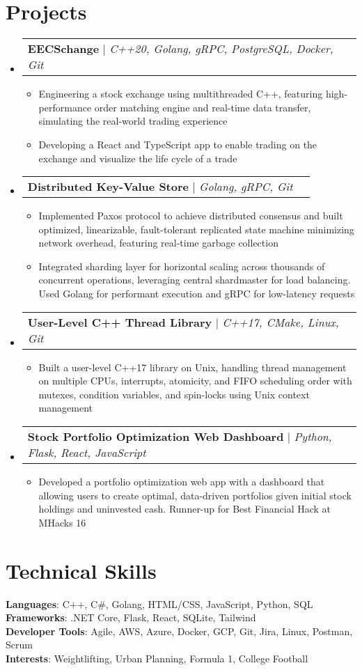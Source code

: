 \documentclass[letterpaper,11pt]{article}
\makeatletter
\newcommand{\resumeItem}[1]{
  \item\small{
    {#1 \vspace{-2pt}}
  }
}
\newcommand{\resumeProjectHeading}[2]{
    \item
    \begin{tabular*}{0.97\textwidth}{l@{\extracolsep{\fill}}r}
      \small#1 & #2 \\
    \end{tabular*}\vspace{-7pt}
}
\newcommand{\resumeSubHeadingListStart}{\begin{itemize}[leftmargin=0.15in, label={}]}
\newcommand{\resumeSubHeadingListEnd}{\end{itemize}}
\newcommand{\resumeItemListStart}{\begin{itemize}}
\newcommand{\resumeItemListEnd}{\end{itemize}\vspace{-5pt}}
\makeatother
\begin{document}
\section{Projects}
    \resumeSubHeadingListStart
      \resumeProjectHeading
          {\textbf{EECSchange} $|$ \emph{C++20, Golang, gRPC, PostgreSQL, Docker, Git}}{}
          \resumeItemListStart
            \resumeItem{Engineering a stock exchange using multithreaded C++, featuring high-performance order matching engine and real-time data transfer, simulating the real-world trading experience}
            \resumeItem{Developing a React and TypeScript app to enable trading on the exchange and visualize the life cycle of a trade}
          \resumeItemListEnd
      \resumeProjectHeading
          {\textbf{Distributed Key-Value Store} $|$ \emph{Golang, gRPC, Git}}{}
          \resumeItemListStart
            \resumeItem{Implemented Paxos protocol to achieve distributed consensus and built optimized, linearizable, fault-tolerant replicated state machine minimizing network overhead, featuring real-time garbage collection}
            \resumeItem{Integrated sharding layer for horizontal scaling across thousands of concurrent operations, leveraging central shardmaster for load balancing. Used Golang for performant execution and gRPC for low-latency requests}
          \resumeItemListEnd
      \resumeProjectHeading
        {\textbf{User-Level C++ Thread Library} $|$ \emph{C++17, CMake, Linux, Git}}{}
        \resumeItemListStart
          \resumeItem{Built a user-level C++17 library on Unix, handling thread management on multiple CPUs, interrupts, atomicity, and FIFO scheduling order with mutexes, condition variables, and spin-locks using Unix context management}
        \resumeItemListEnd
      \resumeProjectHeading
        {\textbf{Stock Portfolio Optimization Web Dashboard} $|$ \emph{Python, Flask, React, JavaScript}}{}
        \resumeItemListStart
          \resumeItem{Developed a portfolio optimization web app with a dashboard that allowing users to create optimal, data-driven portfolios given initial stock holdings and uninvested cash. Runner-up for Best Financial Hack at MHacks 16}
        \resumeItemListEnd
    \resumeSubHeadingListEnd
%
\section{Technical Skills}
 \begin{itemize}[leftmargin=0.15in, label={}]
    \small{\item{
     \textbf{Languages}{: C++, C\#, Golang, HTML/CSS, JavaScript, Python,  SQL} \\
     \textbf{Frameworks}{: .NET Core, Flask, React, SQLite, Tailwind} \\
     \textbf{Developer Tools}{: Agile, AWS, Azure, Docker, GCP, Git, Jira, Linux, Postman, Scrum} \\
     \textbf{Interests}{: Weightlifting, Urban Planning, Formula 1, College Football}
    }}
 \end{itemize}


\end{document}
